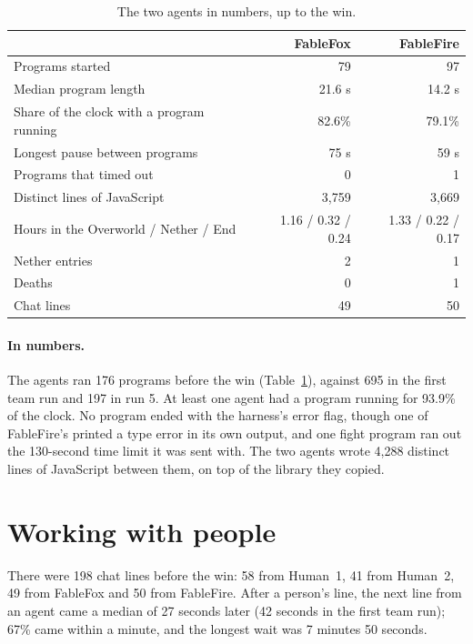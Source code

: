 \documentclass[11pt,a4paper]{article}
\begin{document}
\begin{table}[t]
  \caption{The two agents in numbers, up to the win.}
  \label{tab:agents}
  \small
  \begin{tabularx}{\textwidth}{@{}Xrr@{}}
    \toprule
    & \textbf{FableFox} & \textbf{FableFire} \\
    \midrule
    Programs started & 79 & 97 \\
    Median program length & 21.6 s & 14.2 s \\
    Share of the clock with a program running & 82.6\% & 79.1\% \\
    Longest pause between programs & 75 s & 59 s \\
    Programs that timed out & 0 & 1 \\
    Distinct lines of JavaScript & 3,759 & 3,669 \\
    Hours in the Overworld / Nether / End & 1.16 / 0.32 / 0.24 & 1.33 / 0.22 / 0.17 \\
    Nether entries & 2 & 1 \\
    Deaths & 0 & 1 \\
    Chat lines & 49 & 50 \\
    \bottomrule
  \end{tabularx}
\end{table}

\paragraph{In numbers.} The agents ran 176 programs before the win (Table~\ref{tab:agents}), against 695 in the first team run and 197 in run 5. At least one agent had a program running for 93.9\% of the clock. No program ended with the harness's error flag, though one of FableFire's printed a type error in its own output, and one fight program ran out the 130-second time limit it was sent with. The two agents wrote 4,288 distinct lines of JavaScript between them, on top of the library they copied.

\section{Working with people}
\label{sec:people}

There were 198 chat lines before the win: 58 from Human~1, 41 from Human~2, 49 from FableFox and 50 from FableFire. After a person's line, the next line from an agent came a median of 27 seconds later (42 seconds in the first team run); 67\% came within a minute, and the longest wait was 7 minutes 50 seconds.
\end{document}
